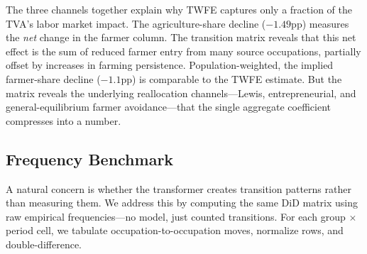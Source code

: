 \documentclass[12pt]{article}
\begin{document}
The three channels together explain why TWFE captures only a fraction of the TVA's labor market impact. The agriculture-share decline ($-1.49$pp) measures the \textit{net} change in the farmer column. The transition matrix reveals that this net effect is the sum of reduced farmer entry from many source occupations, partially offset by increases in farming persistence. Population-weighted, the implied farmer-share decline ($-1.1$pp) is comparable to the TWFE estimate. But the matrix reveals the underlying reallocation channels---Lewis, entrepreneurial, and general-equilibrium farmer avoidance---that the single aggregate coefficient compresses into a number.

\subsection{Frequency Benchmark}

A natural concern is whether the transformer creates transition patterns rather than measuring them. We address this by computing the same DiD matrix using raw empirical frequencies---no model, just counted transitions. For each group $\times$ period cell, we tabulate occupation-to-occupation moves, normalize rows, and double-difference.
\end{document}
